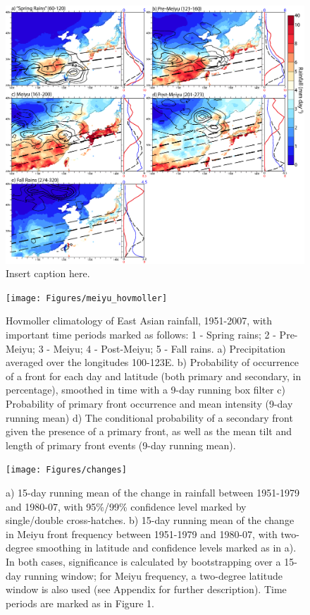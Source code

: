 \documentclass[draft,grl]{AGUTeX}
\begin{document}
\begin{figure}
\label{climo}
\noindent\includegraphics[width=36pc]{Figures/climo}
\caption{Insert caption here.}
\end{figure}

\begin{figure}
\label{hov}
\noindent\texttt{[image: Figures/meiyu\_hovmoller]}
\caption{Hovmoller climatology of East Asian rainfall, 1951-2007, with important time periods marked as follows: 1 - Spring rains; 2 - Pre-Meiyu; 3 - Meiyu; 4 - Post-Meiyu; 5 - Fall rains. a) Precipitation averaged over the longitudes 100-123\textdegree E. b) Probability of occurrence of a front for each day and latitude (both primary and secondary, in percentage), smoothed in time with a 9-day running box filter c) Probability of primary front occurrence and mean intensity (9-day running mean) d) The conditional probability of a secondary front given the presence of a primary front, as well as the mean tilt and length of primary front events (9-day running mean).}
\end{figure}

\begin{figure}[htbp]
\begin{center}
\texttt{[image: Figures/changes]}
\caption{a) 15-day running mean of the change in rainfall between 1951-1979 and 1980-07, with 95\%/99\% confidence level marked by single/double cross-hatches. b) 15-day running mean of the change in Meiyu front frequency between 1951-1979 and 1980-07, with two-degree smoothing in latitude and confidence levels marked as in a). In both cases, significance is calculated by bootstrapping over a 15-day running window; for Meiyu frequency, a two-degree latitude window is also used (see Appendix for further description). Time periods are marked as in Figure 1.}
\label{changes}
\end{center}
\end{figure}
\end{document}
